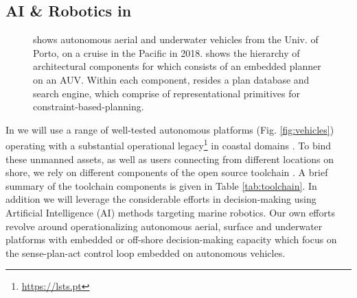 \subsection{AI \& Robotics in \proje}

\begin{figure}[!h]
  \centering 
  \hspace{+0.5cm} 
  \caption{ shows autonomous aerial and
    underwater vehicles from the Univ. of Porto, on a cruise in the
    Pacific in 2018.  %
     shows the hierarchy of architectural
    components for \rx \cite{py10,rajan12,rajan12b} which consists of
    an embedded planner on an AUV. Within each \rx component, resides
    a plan database and search engine, which comprise of
    representational primitives for constraint-based-planning.}
  \label{fig:ai-figs}
\end{figure}

In \proj we will use a range of well-tested autonomous platforms
(Fig. \ref{fig:vehicles}) operating with a substantial operational
legacy\footnote{\url{https://lsts.pt}} in coastal domains
\cite{pinto13,pinto14,sousa16,Ferreira2018,Pinto2018MultipleAV}. To
bind these unmanned assets, as well as users connecting from different
locations on shore, we rely on different components of the open source
\ls toolchain \cite{pinto2013lsts}. A brief summary of the toolchain
components is given in Table \ref{tab:toolchain}. In addition we will
leverage the considerable efforts in decision-making using Artificial
Intelligence (AI) methods targeting marine robotics. Our own efforts
revolve around operationalizing autonomous aerial, surface and
underwater platforms with embedded or off-shore decision-making
capacity which focus on the sense-plan-act control loop embedded on
autonomous vehicles.

